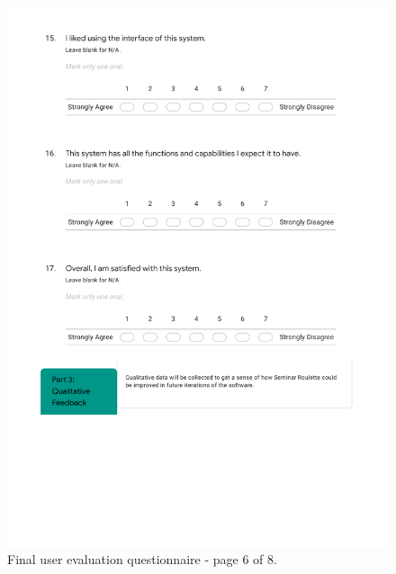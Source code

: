 \documentclass{l4proj}
\begin{document}
\begin{appendices}
\begin{figure}[htb]
    \centering
    \includegraphics[width=\linewidth]{images/final_evaluation_6.pdf}    
    \caption{Final user evaluation questionnaire - page 6 of 8.}
    \label{fig:final_evaluation_6} 
\end{figure}


\end{appendices}
\end{document}
